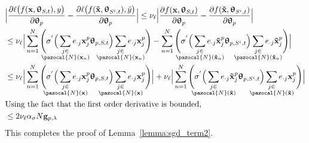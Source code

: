 \documentclass{article}
\newcommand{\Na}{\pazocal{N}}
\begin{document}
\begin{equation} 	
\begin{split}
& \Big|   \frac{\partial \ell\big(f(\mathbf{x},\bm{\uptheta}_{S, t} ),y \big)}{\partial \bm{\uptheta}_{p} }    -      \frac{\partial \ell \big(f(\mathbf{\tilde{x}} ,\bm{\uptheta}_{S^{i}, t} ),\tilde{y} \big)}{\partial \bm{\uptheta}_{p} }     \Big| \nonumber \leq   \nu_{\ell} \Big| \frac{\partial f(\mathbf{x},\bm{\uptheta}_{S, t} )}{\partial \bm{\uptheta}_{p} }     -  \frac{\partial f(\mathbf{\tilde{x}},\bm{\uptheta}_{S^{i}, t} )}{\partial \bm{\uptheta}_{p} }   \Big|  \\
& \leq \nu_{\ell} \Big| \sum_{n=1}^{N}  \Bigg(  \sigma^{'} \Big( \sum_{\mathclap{\substack{j\in \\ \Na(\mathbf{x}_n)}}}  e_{\cdot j}  \mathbf{x}^{p}_{j}  \bm{\uptheta}_{p, S, t} \Big)  \sum_{\mathclap{\substack{j\in \\ \Na(\mathbf{x}_n) }}}  e_{\cdot j}  \mathbf{x}^{p}_{j} \Bigg) -    \sum_{n=1}^{N}  \Bigg( \sigma^{'} \Big( \sum_{\mathclap{\substack{j\in \\ \Na(\mathbf{\tilde{x}}_n )}}}  e_{\cdot j}  \mathbf{\tilde{x}}^{p}_{j}   \bm{\uptheta}_{p, S^{i}, t} \Big)  \sum_{\mathclap{\substack{j\in \\ \Na(\mathbf{\tilde{x}}_n ) }}}  e_{\cdot j}  \mathbf{\tilde{x}}^{p}_{j} \Bigg) \Big|   \\
& \leq \nu_{\ell}\Big|  \sum_{n=1}^{N}  \Bigg( \sigma^{'} \Big( \sum_{\mathclap{\substack{j\in \\ \Na(\mathbf{x})}}}  e_{\cdot j}  \mathbf{x}^{p}_{j}  \bm{\uptheta}_{p, S, t} \Big)  \sum_{\mathclap{\substack{j\in \\ \Na(\mathbf{x}) }}}  e_{\cdot j}  \mathbf{x}^{p}_{j} \Bigg) \Big|  +  \nu_{\ell}\Big|  \sum_{n=1}^{N}  \Bigg( \sigma^{'}\Big( \sum_{\mathclap{\substack{j\in \\ \Na(\mathbf{\tilde{x}} )}}}  e_{\cdot j}  \mathbf{\tilde{x}}^{p}_{j}   \bm{\uptheta}_{p, S^{i}, t} \Big)  \sum_{\mathclap{\substack{j\in \\ \Na(\mathbf{\tilde{x}} ) }}}  e_{\cdot j}  \mathbf{x}^{p}_{j} \Bigg) \Big|  \\
& \text{Using the fact that  the first order derivative is bounded,  } \\
& \leq 2\nu_{\ell} \alpha_{\sigma} N \mathbf{g}_{p, \lambda}  \\
\end{split}
\raisetag{6\normalbaselineskip}
\end{equation}
This completes the proof of Lemma~\ref{lemma:sgd_term2}. \\
\end{document}
